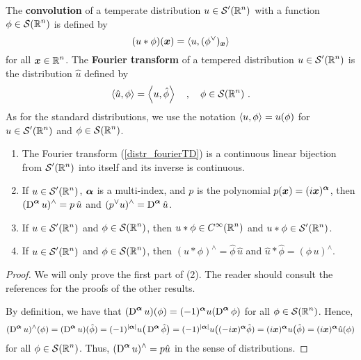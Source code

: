 The {\bfseries convolution} of a
temperate distribution $\displaystyle u \in \mathcal{S}'(\mathbb{R}^n)$ with a
function $\displaystyle \phi \in \mathcal{S}(\mathbb{R}^n)$ is defined by
\[
  (u \ast \phi)({\bm{x}}) = \left\langle{u} , {(\phi^\vee)_{{\bm{x}}}}\right\rangle
\]
for all $\displaystyle {\bm{x}} \in \mathbb{R}^n$.
The {\bfseries Fourier transform}
of a tempered distribution $\displaystyle u \in \mathcal{S}'(\mathbb{R}^n)$ is the
distribution $\hat{u}$ defined by
\begin{equation} \label{distr_fourierTD}
\left\langle{\hat{u}} , {\phi}\right\rangle = \left\langle{u} , {\hat{\phi}}\right\rangle \quad , \quad \phi \in \mathcal{S}(\mathbb{R}^n) \ .
\end{equation}
As for the standard distributions, we use the notation
$\left\langle{u} , {\phi}\right\rangle = u(\phi)$ for $\displaystyle u \in \mathcal{S}'(\mathbb{R}^n)$ and
$\displaystyle \phi \in \mathcal{S}(\mathbb{R}^n)$.

\begin{prop} \label{distr_frr_tempD}
\begin{enumerate}
\item The Fourier transform (\ref{distr_fourierTD}) is a continuous
linear bijection from $\displaystyle \mathcal{S}'(\mathbb{R}^n)$ into itself and its
inverse is continuous.
\item If $\displaystyle u \in \mathcal{S}'(\mathbb{R}^n)$, ${\bm{\alpha}}$ is a multi-index,
and $p$ is the polynomial
$\displaystyle p({\bm{x}}) = (i{\bm{x}})^{{\bm{\alpha}}}$, then
$\displaystyle (\operatorname{D}^{{\bm{\alpha}}} u)^\wedge = p\, \hat{u}$ and
$\displaystyle (p^\vee u)^\wedge = \operatorname{D}^{{\bm{\alpha}}}\hat{u}$.
\item If $\displaystyle u \in \mathcal{S}'(\mathbb{R}^n)$ and
$\displaystyle \phi \in \mathcal{S}(\mathbb{R}^n)$, then
$\displaystyle u\ast \phi \in C^\infty(\mathbb{R}^n)$ and
$\displaystyle u\ast \phi \in \mathcal{S}'(\mathbb{R}^n)$.
\item If $\displaystyle u \in \mathcal{S}'(\mathbb{R}^n)$ and
$\displaystyle \phi \in \mathcal{S}(\mathbb{R}^n)$, then
$\displaystyle (u\ast \phi)^\wedge = \hat{\phi}\,\hat{u}$ and
$\displaystyle \hat{u}\ast \hat{\phi} = (\phi\,u)^\wedge$.
\end{enumerate}
\end{prop}

\begin{proof}
We will only prove the first part of (2).  The reader should consult
the references for the proofs of the other results.

By definition, we have that
$\displaystyle (\operatorname{D}^{{\bm{\alpha}}} u)(\phi) = (-1)^{{\bm{\alpha}}}
u(\operatorname{D}^{{\bm{\alpha}}} \phi)$
for all $\displaystyle \phi \in \mathcal{S}(\mathbb{R}^n)$.  Hence,
\[
(\operatorname{D}^{{\bm{\alpha}}} u)^\wedge (\phi)
= (\operatorname{D}^{{\bm{\alpha}}} u)(\hat{\phi})
= (-1)^{|{\bm{\alpha}}|} u\big(\operatorname{D}^{{\bm{\alpha}}} \hat{\phi}\big)
= (-1)^{|{\bm{\alpha}}|} u\big((-i{\bm{x}})^{{\bm{\alpha}}} \hat{\phi})
= (i{\bm{x}})^{{\bm{\alpha}}} u\big( \hat{\phi})
= (i{\bm{x}})^{{\bm{\alpha}}} \hat{u}(\phi)
\]
for all $\displaystyle \phi \in \mathcal{S}(\mathbb{R}^n)$.  Thus,
$\displaystyle (\operatorname{D}^{{\bm{\alpha}}} u)^\wedge = p \hat{u}$ in the sense of
distributions.
\end{proof}

